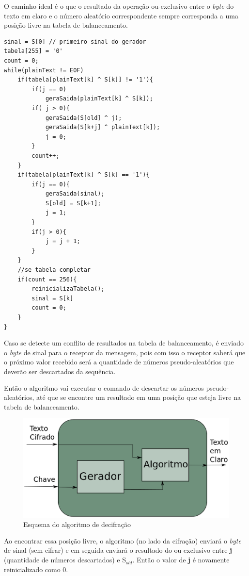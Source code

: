 O caminho ideal é o que o resultado da operação ou-exclusivo entre o \textit{byte} do texto em claro e o número aleatório correspondente sempre corresponda a uma posição livre na tabela de balanceamento.

\begin{lstlisting}[caption={Pseudo-Código}, label=pseudo-codigo]
sinal = S[0] // primeiro sinal do gerador
tabela[255] = '0'
count = 0;
while(plainText != EOF)
	if(tabela[plainText[k] ^ S[k]] != '1'){
		if(j == 0)
			geraSaida(plainText[k] ^ S[k]);
		if( j > 0){
			geraSaida(S[old] ^ j);
			geraSaida(S[k+j] ^ plainText[k]);
			j = 0;
		}
		count++;
	}
	if(tabela[plainText[k] ^ S[k] == '1'){
		if(j == 0){
			geraSaida(sinal);
			S[old] = S[k+1];
			j = 1;		
		}
		if(j > 0){
			j = j + 1;
		}
	}
	//se tabela completar
	if(count == 256){
		reinicializaTabela();
		sinal = S[k]
		count = 0;
	}
}
    \end{lstlisting}


Caso se detecte um conflito de resultados na tabela de balanceamento, é enviado o \textit{byte} de sinal para o receptor da mensagem, pois com isso o receptor saberá que o próximo valor recebido será a quantidade de números pseudo-aleatórios que deverão ser descartados da sequência. 

Então o algoritmo vai executar o comando de descartar os números pseudo-aleatórios, até que se encontre um resultado em uma posição que esteja livre na tabela de balanceamento. 


\begin{figure}[h]
	\centering
	\includegraphics[scale=0.4]{figuras/metodo_de_decifra.eps}
	\caption{Esquema do algoritmo de decifração}
\end{figure}

Ao encontrar essa posição livre, o algoritmo (no lado da cifração) enviará o \textit{byte} de sinal (sem cifrar) e em seguida enviará o resultado do ou-exclusivo entre \textbf{j} (quantidade de números descartados) e S$_{old}$. Então o valor de \textbf{j} é novamente reinicializado como 0.

